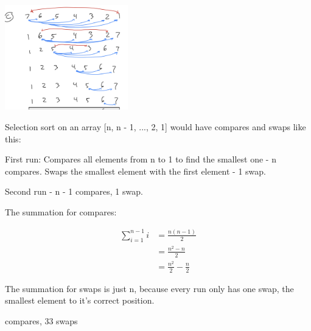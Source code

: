 \documentclass[11pt,largemargins]{homework}
\begin{document}
\begin{alphaparts}
  \includegraphics[width=0.4\textwidth]{hw1drawings/4c1.png}

  \newpage
  \questionpart
  Selection sort on an array [n, n - 1, ..., 2, 1] would have compares and swaps like this:

  First run: Compares all elements from n to 1 to find the smallest one - n compares.
  Swaps the smallest element with the first element - 1 swap.

  Second run - n - 1 compares, 1 swap.

  The summation for compares:

  \begin{align*}
    \sum_{i = 1}^{n - 1} i &= \frac{n(n - 1)}{2} \\
    &= \frac{n^2 - n}{2} \\
    &= \frac{n^2}{2} - \frac{n}{2}
  \end{align*}

  The summation for swaps is just n, because every run only has one swap, the smallest element to it's correct position.

  \newpage
   compares, 33 swaps


\end{alphaparts}
\end{document}
